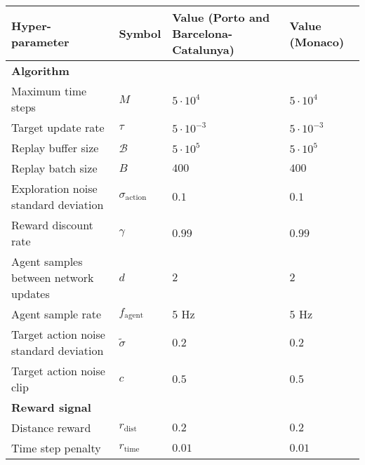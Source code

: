 
\begin{table}[htb!]
\centering
\small
\begin{tabularx}{0.95\textwidth}{RCLN} 
    \hline
    \textbf{Hyper-parameter} & \textbf{Symbol} & \textbf{Value (Porto and Barcelona-Catalunya)} & \textbf{Value (Monaco)} \\ 
    \hline
    \textbf{Algorithm}                      &                           &                   &\\
    Maximum time steps                      & $M$                       & $5 \cdot 10^{4}$  & $5 \cdot 10^{4}$ \\
    Target update rate                      & $\tau$                    & $5\cdot10^{-3}$   & $5\cdot10^{-3}$ \\
    Replay buffer size                      & $\mathcal{B}$             & $5\cdot 10^5$     & $5\cdot 10^5$ \\
    Replay batch size                       & $B$                       & $400$             & $400$  \\
    Exploration noise standard deviation    & $\sigma_{\text{action}}$  & $0.1$             & $0.1$ \\
    Reward discount rate                    & $\gamma$                  & $0.99$            & $0.99$ \\
    Agent samples between network updates   & $d$                       & $2$               & $2$ \\
    Agent sample rate                       & $f_{\text{agent}}$        & $5$ Hz            & $5$ Hz \\
    Target action noise standard deviation  & $\tilde{\sigma}$          & $0.2$             & $0.2$ \\ 
    Target action noise clip                & $c$                       & $0.5$             & $0.5$ \\
    \textbf{Reward signal}                  &                           &                   & \\
    Distance reward                         & $r_{\text{dist}}$         & $0.2$             & $0.2$  \\ 
    Time step penalty                       & $r_{\text{time}}$         & $0.01$            & $0.01$ \\

\end{tabularx}
\end{table}
